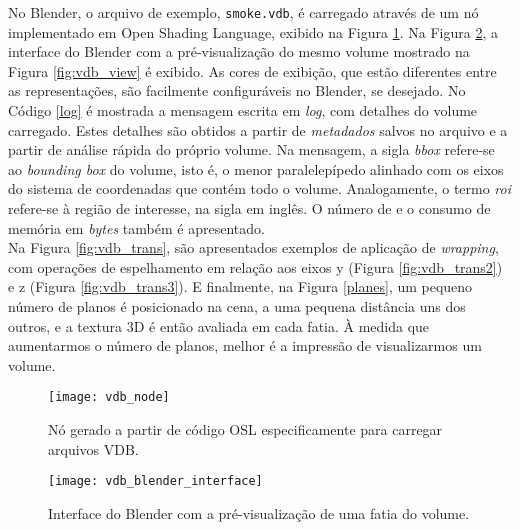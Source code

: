 No Blender, o arquivo de exemplo, \texttt{smoke.vdb}, é carregado através de um nó implementado em Open Shading Language, exibido na Figura \ref{vdb_node}. Na Figura \ref{vdb_blender_interface}, a interface do Blender com a pré-visualização do mesmo volume mostrado na Figura \ref{fig:vdb_view} é exibido. As cores de exibição, que estão diferentes entre as representações, são facilmente configuráveis no Blender, se desejado. No Código \ref{log} é mostrada a mensagem escrita em {\it log}, com detalhes do volume carregado. Estes detalhes são obtidos a partir de \emph{metadados} salvos no arquivo e a partir de análise rápida do próprio volume. Na mensagem, a sigla \emph{bbox} refere-se ao \emph{bounding box} do volume, isto é, o menor paralelepípedo alinhado com os eixos do sistema de coordenadas que contém todo o volume. Analogamente, o termo \emph{roi} refere-se à região de interesse, na sigla em inglês. O número de \voxels e o consumo de memória em {\it bytes} também é apresentado. \\

Na Figura \ref{fig:vdb_trans}, são apresentados exemplos de aplicação de \emph{wrapping}, com operações de espelhamento em relação aos eixos y (Figura \ref{fig:vdb_trans2}) e z (Figura \ref{fig:vdb_trans3}). E finalmente, na Figura \ref{planes}, um pequeno número de planos é posicionado na cena, a uma pequena distância uns dos outros, e a textura 3D é então avaliada em cada fatia. À medida que aumentarmos o número de planos, melhor é a impressão de visualizarmos um volume.



\begin{figure}[!htb]
\center
\texttt{[image: vdb\_node]}
\caption{Nó gerado a partir de código OSL especificamente para carregar arquivos VDB.}
\label{vdb_node}
\end{figure}

\begin{figure}[!htb]
\center
\texttt{[image: vdb\_blender\_interface]}
\caption{Interface do Blender com a pré-visualização de uma fatia do volume.}
\label{vdb_blender_interface}
\end{figure}

